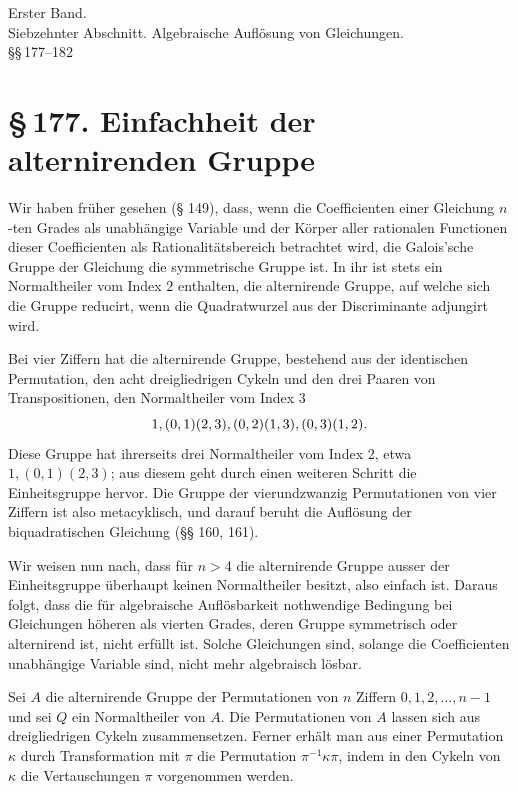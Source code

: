 \documentclass[11pt]{article}
\newcommand{\sect}[2]{\section*{\S\,#1. #2}}
\begin{document}
\begin{center}
{\large Erster Band.}\\[0.35em]
{\Large Siebzehnter Abschnitt. Algebraische Auflösung von Gleichungen.}\\[0.35em]
{\large \S\S\,177--182}
\end{center}

\sect{177}{Einfachheit der alternirenden Gruppe}

Wir haben früher gesehen (§ 149), dass, wenn die Coefficienten einer Gleichung $n$-ten Grades als unabhängige Variable und der Körper aller rationalen Functionen dieser Coefficienten als Rationalitätsbereich betrachtet wird, die Galois'sche Gruppe der Gleichung die symmetrische Gruppe ist. In ihr ist stets ein Normaltheiler vom Index $2$ enthalten, die alternirende Gruppe, auf welche sich die Gruppe reducirt, wenn die Quadratwurzel aus der Discriminante adjungirt wird.

Bei vier Ziffern hat die alternirende Gruppe, bestehend aus der identischen Permutation, den acht dreigliedrigen Cykeln und den drei Paaren von Transpositionen, den Normaltheiler vom Index $3$
\[
  1,\\ (0,1)(2,3),\\ (0,2)(1,3),\\ (0,3)(1,2).
\]
Diese Gruppe hat ihrerseits drei Normaltheiler vom Index $2$, etwa $1,(0,1)(2,3)$; aus diesem geht durch einen weiteren Schritt die Einheitsgruppe hervor. Die Gruppe der vierundzwanzig Permutationen von vier Ziffern ist also metacyklisch, und darauf beruht die Auflösung der biquadratischen Gleichung (§§ 160, 161).

Wir weisen nun nach, dass für $n>4$ die alternirende Gruppe ausser der Einheitsgruppe überhaupt keinen Normaltheiler besitzt, also einfach ist. Daraus folgt, dass die für algebraische Auflösbarkeit nothwendige Bedingung bei Gleichungen höheren als vierten Grades, deren Gruppe symmetrisch oder alternirend ist, nicht erfüllt ist. Solche Gleichungen sind, solange die Coefficienten unabhängige Variable sind, nicht mehr algebraisch lösbar.

Sei $A$ die alternirende Gruppe der Permutationen von $n$ Ziffern $0,1,2,\ldots,n-1$ und sei $Q$ ein Normaltheiler von $A$. Die Permutationen von $A$ lassen sich aus dreigliedrigen Cykeln zusammensetzen. Ferner erhält man aus einer Permutation $\kappa$ durch Transformation mit $\pi$ die Permutation $\pi^{-1}\kappa\pi$, indem in den Cykeln von $\kappa$ die Vertauschungen $\pi$ vorgenommen werden.
\end{document}
